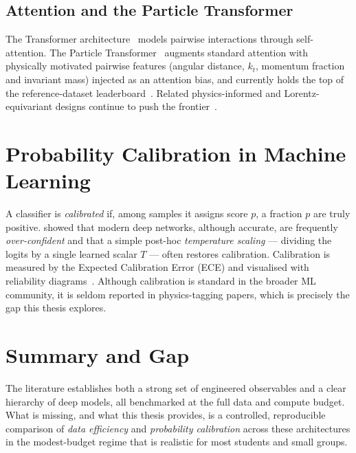 \subsection{Attention and the Particle Transformer}
The Transformer architecture~\citep{vaswani2017attention} models pairwise
interactions through self-attention. The Particle
Transformer~\citep{qu2022particletransformer} augments standard attention
with physically motivated pairwise features (angular distance, $k_t$,
momentum fraction and invariant mass) injected as an attention bias, and
currently holds the top of the reference-dataset
leaderboard~\citep{kasieczka2019landscape}. Related physics-informed and
Lorentz-equivariant designs continue to push the
frontier~\citep{bogatskiy2020lorentz,gong2022lorentznet}.

\section{Probability Calibration in Machine Learning}
\label{sec:calibration_lit}

A classifier is \emph{calibrated} if, among samples it assigns score $p$, a
fraction $p$ are truly positive. \citet{guo2017calibration} showed that
modern deep networks, although accurate, are frequently \emph{over-confident}
and that a simple post-hoc \emph{temperature scaling} --- dividing the logits
by a single learned scalar $T$ --- often restores calibration. Calibration is
measured by the Expected Calibration Error (ECE) and visualised with
reliability diagrams~\citep{niculescu2005calibration}. Although calibration
is standard in the broader ML community, it is seldom reported in
physics-tagging papers, which is precisely the gap this thesis explores.

\section{Summary and Gap}
\label{sec:gap}

The literature establishes both a strong set of engineered observables and a
clear hierarchy of deep models, all benchmarked at the full data and compute
budget. What is missing, and what this thesis provides, is a controlled,
reproducible comparison of \emph{data efficiency} and \emph{probability
calibration} across these architectures in the modest-budget regime that is
realistic for most students and small groups.
